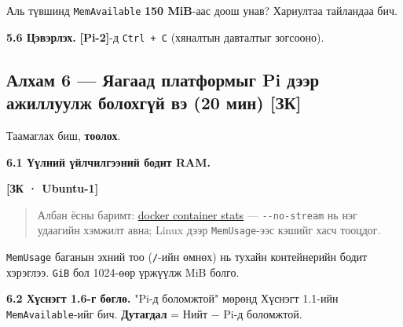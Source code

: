 Аль түвшинд \texttt{MemAvailable} \textbf{150 MiB}-аас доош унав? Хариултаа тайландаа бич.

\textbf{5.6 Цэвэрлэх.} \textbf{{[}Pi-2{]}}-д \texttt{Ctrl\ +\ C} (хяналтын давталтыг зогсооно).

\hypertarget{ux430ux43bux445ux430ux43c-6-ux44fux430ux433ux430ux430ux434-ux43fux43bux430ux442ux444ux43eux440ux43cux44bux433-pi-ux434ux44dux44dux440-ux430ux436ux438ux43bux43bux443ux443ux43bux436-ux431ux43eux43bux43eux445ux433ux4afux439-ux432ux44d-20-ux43cux438ux43d-ux437ux43a}{%
\subsection{Алхам 6 --- Яагаад платформыг Pi дээр ажиллуулж болохгүй вэ (20 мин) {[}ЗК{]}}\label{ux430ux43bux445ux430ux43c-6-ux44fux430ux433ux430ux430ux434-ux43fux43bux430ux442ux444ux43eux440ux43cux44bux433-pi-ux434ux44dux44dux440-ux430ux436ux438ux43bux43bux443ux443ux43bux436-ux431ux43eux43bux43eux445ux433ux4afux439-ux432ux44d-20-ux43cux438ux43d-ux437ux43a}}

Таамаглах биш, \textbf{тоолох}.

\textbf{6.1 Үүлний үйлчилгээний бодит RAM.}

\textbf{{[}ЗК · Ubuntu-1{]}}

\begin{Shaded}
\begin{Highlighting}[]
 \KeywordTok{|} 
\end{Highlighting}
\end{Shaded}

\begin{quote}
Албан ёсны баримт: \href{https://docs.docker.com/reference/cli/docker/container/stats/}{docker container stats} --- \texttt{-\/-no-stream} нь нэг удаагийн хэмжилт авна; Linux дээр \texttt{MemUsage}-ээс кэшийг хасч тооцдог.
\end{quote}

\texttt{MemUsage} баганын эхний тоо (\texttt{/}-ийн өмнөх) нь тухайн контейнерийн бодит хэрэглээ. \texttt{GiB} бол 1024-өөр үржүүлж MiB болго.

\textbf{6.2 Хүснэгт 1.6-г бөглө.} "Pi-д боломжтой" мөрөнд Хүснэгт 1.1-ийн \texttt{MemAvailable}-ийг бич. \textbf{Дутагдал} = Нийт − Pi-д боломжтой.

